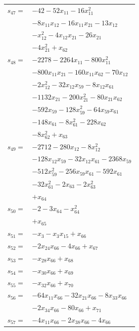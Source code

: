 \begin{longtable}{@{}r@{\;}l@{}}
\(s_{47}=\) & \(\displaystyle -42 -52x_{11} -16x_{11}^{2}\) \\
 & \(\displaystyle -8x_{11}x_{12} -16x_{11}x_{21} -13x_{12}\) \\
 & \(\displaystyle -x_{12}^{2} -4x_{12}x_{21} -26x_{21}\) \\
 & \(\displaystyle -4x_{21}^{2} +x_{62}\) \\[3pt]
\(s_{48}=\) & \(\displaystyle -2278 -2264x_{11} -800x_{11}^{2}\) \\
 & \(\displaystyle -800x_{11}x_{21} -160x_{11}x_{62} -70x_{12}\) \\
 & \(\displaystyle -2x_{12}^{2} -32x_{12}x_{59} -8x_{12}x_{61}\) \\
 & \(\displaystyle -1132x_{21} -200x_{21}^{2} -80x_{21}x_{62}\) \\
 & \(\displaystyle -592x_{59} -128x_{59}^{2} -64x_{59}x_{61}\) \\
 & \(\displaystyle -148x_{61} -8x_{61}^{2} -228x_{62}\) \\
 & \(\displaystyle -8x_{62}^{2} +x_{63}\) \\[3pt]
\(s_{49}=\) & \(\displaystyle -2712 -280x_{12} -8x_{12}^{2}\) \\
 & \(\displaystyle -128x_{12}x_{59} -32x_{12}x_{61} -2368x_{59}\) \\
 & \(\displaystyle -512x_{59}^{2} -256x_{59}x_{61} -592x_{61}\) \\
 & \(\displaystyle -32x_{61}^{2} -2x_{63} -2x_{63}^{2}\) \\
 & \(\displaystyle +x_{64}\) \\[3pt]
\(s_{50}=\) & \(\displaystyle -2 -3x_{64} -x_{64}^{2}\) \\
 & \(\displaystyle +x_{65}\) \\[3pt]
\(s_{51}=\) & \(\displaystyle -x_{3} -x_{3}x_{15} +x_{66}\) \\[3pt]
\(s_{52}=\) & \(\displaystyle -2x_{24}x_{66} -4x_{66} +x_{67}\) \\[3pt]
\(s_{53}=\) & \(\displaystyle -x_{28}x_{66} +x_{68}\) \\[3pt]
\(s_{54}=\) & \(\displaystyle -x_{30}x_{66} +x_{69}\) \\[3pt]
\(s_{55}=\) & \(\displaystyle -x_{32}x_{66} +x_{70}\) \\[3pt]
\(s_{56}=\) & \(\displaystyle -64x_{11}x_{66} -32x_{21}x_{66} -8x_{33}x_{66}\) \\
 & \(\displaystyle -2x_{34}x_{66} -80x_{66} +x_{71}\) \\[3pt]
\(s_{57}=\) & \(\displaystyle -4x_{11}x_{66} -2x_{38}x_{66} -4x_{66}\) \\

\end{longtable}
